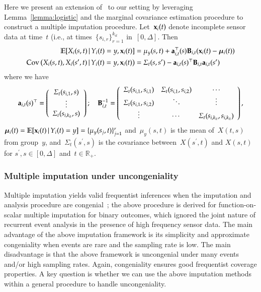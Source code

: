 \documentclass[12pt]{amsart}
\def\E{\mathcal{E}}
\def\E{\mathbb{E}}
\def\given{\, | \,}
\def\bfx{{\bf x}}
\def\bfT{{\bf T}}
\def\bfD{{\bf D}}
\begin{document}
Here we present an extension of~\cite{Petrovich2018} to our setting by leveraging Lemma~\ref{lemma:logistic} and the marginal covariance estimation procedure to construct a multiple imputation procedure. Let~$\bfx_{i} (t)$ denote incomplete sensor data at time~$t$ (i.e., at times~$\{ s_{i,r} \}_{r=1}^{k_{it}}$ in~$[0,\Delta]$. Then
\begin{align}
\label{eq:impute}
\E [ X_i (s,t) \given Y_i(t) = y, \bfx_i (t) ]
  &= \mu_y (s,t) + {\bf a}_{i,t}^\top (s) {\bf B}_{i,t} (\bfx_i (t) -
    \mathbold{\mu}_i (t) ) \\
\text{Cov} \left( X_i (s,t), X_i (s^\prime, t) \given Y_i (t) = y,
  \bfx_i (t) \right)
  &= \Sigma_{t} (s, s^\prime) -
    {\bf a}_{i,t} (s)^\top {\bf B}_{i,t} {\bf a}_{i,t} (s^\prime)
\end{align}
where we have
\[
{\bf a}_{i,t} (s)^\top = \left( \begin{array}{c} \Sigma_t (s_{i,1}, s) \\ \vdots \\
                       \Sigma_t (s_{i,k_{it}}, s) \end{array} \right); \quad
{\bf B}_{i,t}^{-1} = \left(
  \begin{array}{c c c}
    \Sigma_t(s_{i,1}, s_{i,1}) & \Sigma_t(s_{i,1}, s_{i,2}) & \cdots \\
    \Sigma_t(s_{i,1}, s_{i,2}) & \ddots & \vdots \\
    \vdots & \cdots & \Sigma_t (s_{i,k_{it}}, s_{i,k_{it}})
  \end{array} \right),
\]
$\mathbold{\mu}_i (t) = \E [ \bfx_i (t) \given Y_i (t) = y] = \{
\mu_y (s_{j}, t) \}_{j=1}^r$ and~$\mu_y (s,t)$ is the mean of~$X(t,s)$
from group~$y$, and~$\Sigma_t ( s^\prime, s)$ is the covariance
between~$X(s^\prime,t)$ and $X(s,t)$ for $s^\prime, s \in [0, \Delta]$
and~$t \in \mathbb{R}_+$. 

\subsubsection{Multiple imputation under uncongeniality}

Multiple imputation yields valid frequentist inferences when the imputation and analysis procedure are congenial~\citep{Meng1994};  the above procedure is derived for function-on-scalar multiple imputation for binary outcomes, which ignored the joint nature of recurrent event analysis in the presence of high frequency sensor data. The main advantage of the above imputation framework is its simplicity and approximate congeniality when events are rare and the sampling rate is low.  The main disadvantage is that the above framework is uncongenial under many events and/or high sampling rates. Again, congeniality ensures good frequentist coverage properties.  A key question is whether we can use the above imputation methods within a general procedure to handle uncongeniality.
\end{document}
